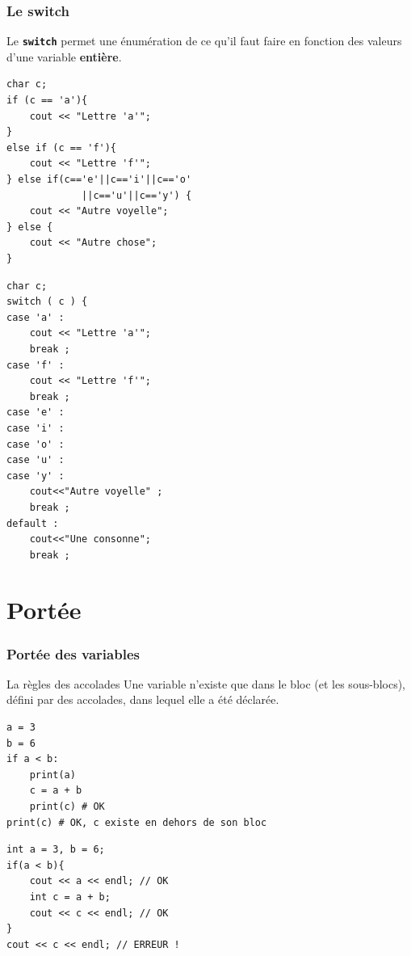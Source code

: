 \begin{frame}[fragile]
	\frametitle{Le switch}
	Le \texttt{\textbf{switch}} permet une énumération de ce qu'il faut faire en fonction des valeurs d'une variable \textbf{entière}.
	\vspace{-0.8em}

	\begin{minipage}{0.47\linewidth}
		\begin{verbatim}
char c;
if (c == 'a'){
    cout << "Lettre 'a'";
}
else if (c == 'f'){
    cout << "Lettre 'f'";
} else if(c=='e'||c=='i'||c=='o'
             ||c=='u'||c=='y') {
    cout << "Autre voyelle";
} else {
    cout << "Autre chose";
}
		\end{verbatim}
	\end{minipage}
	\hfill
	\begin{minipage}{0.47\linewidth}
		\begin{verbatim}
char c;
switch ( c ) {
case 'a' :
    cout << "Lettre 'a'";
    break ;
case 'f' :
    cout << "Lettre 'f'";
    break ;
case 'e' :
case 'i' :
case 'o' :
case 'u' :
case 'y' :
    cout<<"Autre voyelle" ;
    break ;
default :
    cout<<"Une consonne";
    break ;
		\end{verbatim}
	\end{minipage}
\end{frame}

\section{Portée}

\begin{frame}[fragile]
	\frametitle{Portée des variables}
	\begin{block}{La règles des accolades}
		Une variable n'existe que dans le bloc (et les sous-blocs), défini par des accolades, dans lequel elle a été déclarée.
	\end{block}

	\begin{minipage}{0.45\linewidth}
		\begin{verbatim}
a = 3
b = 6
if a < b:
    print(a)
    c = a + b
    print(c) # OK
print(c) # OK, c existe en dehors de son bloc
		\end{verbatim}
	\end{minipage}
	\hfill
	\begin{minipage}{0.50\linewidth}
		\begin{verbatim}
int a = 3, b = 6;
if(a < b){
    cout << a << endl; // OK
    int c = a + b;
    cout << c << endl; // OK
}
cout << c << endl; // ERREUR !
		\end{verbatim}
	\end{minipage}
\end{frame}

